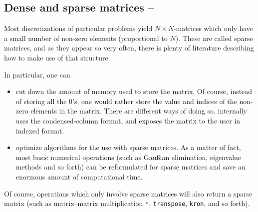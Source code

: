 

\subsection{Dense and sparse matrices -- \fastsymbol\fastsymbol\fastsymbol\fastsymbol\fastsymbol}

Most discretizations of particular problems yield $N\times N$-matrices which only have a small number of non-zero elements (proportional to $N$). These are called sparse matrices, and as they appear so very often, there is plenty of literature describing how to make use of that structure.

In particular, one can
\begin{itemize}
\item cut down the amount of memory used to store the matrix. Of course, instead of storing all the $0$'s, one would rather store the value and indices of the non-zero elements in the matrix. There are different ways of doing so. \matlab{} internally uses the condensed-column format, and exposes the matrix to the user in indexed format.

\item optimize algorithms for the use with sparse matrices. As a matter of fact, most basic numerical operations (such as Gau{\ss}ian elimination, eigenvalue methods and so forth) can be reformulated for sparse matrices and save an enormous amount of computational time.
\end{itemize}


Of course, operations which only involve sparse matrices will also return a sparse matrix (such as matrix--matrix multiplication \lstinline!*!, \lstinline!transpose!, \lstinline!kron!, and so forth).



